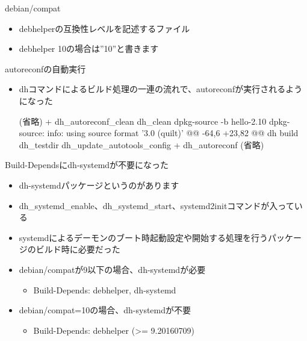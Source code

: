 
\begin{frame}[containsverbatim]{debian/compat}
  \begin{itemize}
  \item debhelperの互換性レベルを記述するファイル
  \item debhelper 10の場合は''10''と書きます
  \end{itemize}
\end{frame}

\begin{frame}[containsverbatim]{autoreconfの自動実行}
  \begin{itemize}
  \item dhコマンドによるビルド処理の一連の流れで、autoreconfが実行されるようになった
    \begin{commandline}
      (省略)
      +   dh_autoreconf_clean
      dh_clean
      dpkg-source -b hello-2.10
      dpkg-source: info: using source format '3.0 (quilt)'
      @@ -64,6 +23,82 @@
      dh build
      dh_testdir
      dh_update_autotools_config
      +   dh_autoreconf
      (省略)
    \end{commandline}
  \end{itemize}
\end{frame}

\begin{frame}[containsverbatim]{Build-Dependsにdh-systemdが不要になった}
  \begin{itemize}
  \item dh-systemdパッケージというのがあります
  \item dh\_systemd\_enable、dh\_systemd\_start、systemd2initコマンドが入っている
  \item systemdによるデーモンのブート時起動設定や開始する処理を行うパッケージのビルド時に必要だった
  \item debian/compatが9以下の場合、dh-systemdが必要
    \begin{itemize}
      \item Build-Depends: debhelper, dh-systemd
    \end{itemize}
  \item debian/compat=10の場合、dh-systemdが不要
    \begin{itemize}
      \item Build-Depends: debhelper (>= 9.20160709)
    \end{itemize}    
  \end{itemize}
\end{frame}

